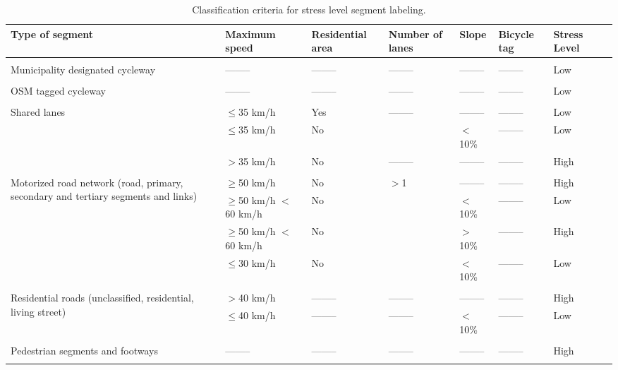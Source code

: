 \documentclass[information,article,submit,moreauthors,pdftex,10pt,a4paper]{mdpi}
\theoremstyle{mdpi}
\newcounter{re}
\theoremstyle{mdpidefinition}
\begin{document}
\begin{table}[H]
	\begin{center}
    	\small
		\centering
		\caption{Classification criteria for stress level segment labeling.}
		\label{table1}
		
\begin{tabular}{m{3.2cm} >{\centering}m{2cm} >{\centering}m{2cm} >{\centering}m{2cm} >{\centering}m{1.3cm} >{\centering}m{} >{\centering}m{1.7cm} @{}m{0pt}@{}}
			\hline
			\centering Type of segment & 
			\centering Maximum speed & 
			\centering Residential area & 
			\centering Number of lanes & 
			\centering Slope & 
			\centering Bicycle tag & 
			\centering Stress Level \tabularnewline
			\hline \tabularnewline [-5pt]
			\raggedright Municipality designated cycleway & -------- & -------- & -------- & -------- & -------- & Low &  \tabularnewline [15pt]
			\hdashline \tabularnewline [-5pt]
			OSM tagged cycleway & -------- & -------- & -------- & -------- & -------- & Low & \tabularnewline [15pt]
			\hdashline \tabularnewline [-5pt]
			\multirow{3}{3cm}{Shared lanes} & $\mathbf{\leq}$35 km/h & Yes & -------- & -------- & -------- & Low & \tabularnewline[15pt]
			& $\mathbf{\leq}$35 km/h & No & 1 & $\mathbf{<}$10\% & -------- & Low & \tabularnewline [15pt]
			& $\mathbf{>}$35 km/h & No & -------- & -------- & -------- & High & \tabularnewline [15pt]	
			\hdashline \tabularnewline [-5pt]	
			\multirow{4}{3cm}{Motorized road network (road, primary, secondary and tertiary segments and links)} & $\mathbf{\geq}$50 km/h & No & $\mathbf{>}$1 & -------- & -------- & High & \tabularnewline [10pt]
			& \pbox{3cm}{$\mathbf{\geq}$50 km/h \\ $\mathbf{<}$60 km/h} & No & 1 & $\mathbf{<}$10\% & -------- & Low & \tabularnewline [20pt]
			& \pbox{3cm}{$\mathbf{\geq}$50 km/h \\ $\mathbf{<}$60 km/h} & No & 1 & $\mathbf{>}$10\% & -------- & High & \tabularnewline [20pt]
			& $\mathbf{\leq}$30 km/h & No & 1 & $\mathbf{<}$10\% & -------- & Low & \tabularnewline [10pt]
			\hdashline \tabularnewline [-5pt]
			\multirow{2}{3cm}{Residential roads (unclassified, residential, living street)} & $\mathbf{>}$40 km/h & -------- & -------- & -------- & -------- & High & \tabularnewline [15pt]
			& $\mathbf{\leq}$40 km/h & -------- & -------- &  $\mathbf{<}$10\% & -------- & Low & \tabularnewline [20pt]
			\hdashline \tabularnewline [-5pt]
			\raggedright Pedestrian segments and footways & -------- & -------- & -------- & -------- & -------- & High & \tabularnewline [10pt]
			\hdashline \tabularnewline [-5pt]	

\end{tabular}
\end{center}
\end{table}
\end{document}
